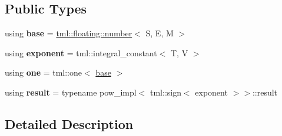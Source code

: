 \subsection*{Public Types}
\begin{DoxyCompactItemize}
\item 
\hypertarget{structtml_1_1pow_3_01tml_1_1floating_1_1number_3_01_s_00_01_e_00_01_m_01_4_00_01tml_1_1integral_6367e7571075cd8d5ef527bb120dcef8_acdddd99beb91791807a6b41fd77fa04d}{using {\bfseries base} = \hyperlink{structtml_1_1floating_1_1number}{tml\+::floating\+::number}$<$ S, E, M $>$}\label{structtml_1_1pow_3_01tml_1_1floating_1_1number_3_01_s_00_01_e_00_01_m_01_4_00_01tml_1_1integral_6367e7571075cd8d5ef527bb120dcef8_acdddd99beb91791807a6b41fd77fa04d}

\item 
\hypertarget{structtml_1_1pow_3_01tml_1_1floating_1_1number_3_01_s_00_01_e_00_01_m_01_4_00_01tml_1_1integral_6367e7571075cd8d5ef527bb120dcef8_ad25d9100351e313d9ab47c5d1cd6f9f6}{using {\bfseries exponent} = tml\+::integral\+\_\+constant$<$ T, V $>$}\label{structtml_1_1pow_3_01tml_1_1floating_1_1number_3_01_s_00_01_e_00_01_m_01_4_00_01tml_1_1integral_6367e7571075cd8d5ef527bb120dcef8_ad25d9100351e313d9ab47c5d1cd6f9f6}

\item 
\hypertarget{structtml_1_1pow_3_01tml_1_1floating_1_1number_3_01_s_00_01_e_00_01_m_01_4_00_01tml_1_1integral_6367e7571075cd8d5ef527bb120dcef8_a5472303f4e70dd2f0cf0586e61e183f7}{using {\bfseries one} = tml\+::one$<$ \hyperlink{structtml_1_1floating_1_1number}{base} $>$}\label{structtml_1_1pow_3_01tml_1_1floating_1_1number_3_01_s_00_01_e_00_01_m_01_4_00_01tml_1_1integral_6367e7571075cd8d5ef527bb120dcef8_a5472303f4e70dd2f0cf0586e61e183f7}

\item 
\hypertarget{structtml_1_1pow_3_01tml_1_1floating_1_1number_3_01_s_00_01_e_00_01_m_01_4_00_01tml_1_1integral_6367e7571075cd8d5ef527bb120dcef8_a3af982a1fb53e741de7e277b1aa870b0}{using {\bfseries result} = typename pow\+\_\+impl$<$ tml\+::sign$<$ exponent $>$$>$\+::result}\label{structtml_1_1pow_3_01tml_1_1floating_1_1number_3_01_s_00_01_e_00_01_m_01_4_00_01tml_1_1integral_6367e7571075cd8d5ef527bb120dcef8_a3af982a1fb53e741de7e277b1aa870b0}

\end{DoxyCompactItemize}


\subsection{Detailed Description}
